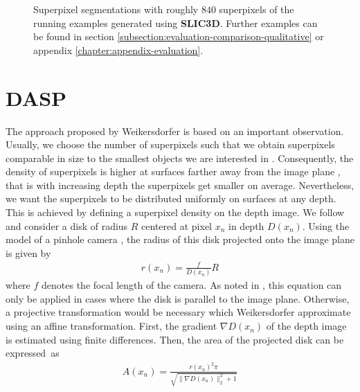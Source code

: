 \begin{figure}[t]
{	}
	\caption[The running examples oversegmented using an extension of \textbf{SLIC} \cite{AchantaShajiSmithLucchiFuaSuesstrunk:2010} using depth information.]{Superpixel segmentations with roughly $840$ superpixels of the running examples generated using \textbf{SLIC3D}. Further examples can be found in section \ref{subsection:evaluation-comparison-qualitative} or appendix \ref{chapter:appendix-evaluation}.}
	\label{fig:superpixel-segmentation-slic3d-comparison}
\end{figure}

\section{DASP}
\label{section:superpixel-segmentation-dasp}

The approach proposed by Weikersdorfer \etal \cite{WeikersdorferGossowBeetz:2012} is based on an important observation. Usually, we choose the number of superpixels such that we obtain superpixels comparable in size to the smallest objects we are interested in \cite{WeikersdorferGossowBeetz:2012}. Consequently, the density of superpixels is higher at surfaces farther away from the image plane \cite{WeikersdorferGossowBeetz:2012}, that is with increasing depth the superpixels get smaller on average. Nevertheless, we want the superpixels to be distributed uniformly on surfaces at any depth. This is achieved by defining a superpixel density on the depth image. We follow \cite{WeikersdorferGossowBeetz:2012} and consider a disk of radius $R$ centered at pixel $x_n$ in depth $D(x_n)$. Using the model of a pinhole camera \cite{ForsythPonce:2002}, the radius of this disk projected onto the image plane is given by
\begin{align}
	r(x_n) = \frac{f}{D(x_n)} R
\end{align}
where $f$ denotes the focal length of the camera. As noted in \cite{WeikersdorferGossowBeetz:2012}, this equation can only be applied in cases where the disk is parallel to the image plane. Otherwise, a projective transformation would be necessary which Weikersdorfer \etal approximate using an affine transformation. First, the gradient $\nabla D(x_n)$ of the depth image is estimated using finite differences. Then, the area of the projected disk can be expressed~as
\begin{align}
	A(x_n) = \frac{r(x_n)^2\pi}{\sqrt{\|\nabla D(x_n)\|_2^2 + 1}}
\end{align}
